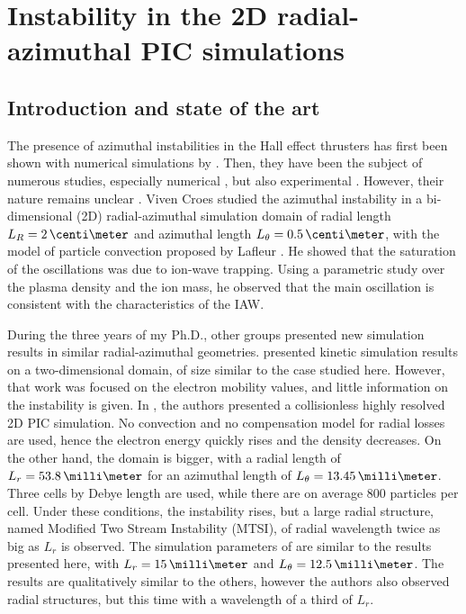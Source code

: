 
\section{Instability in the \acs{2D} radial-azimuthal \acs{PIC} simulations}
  \label{sec-PIC-ECDI}
  
  \subsection{Introduction and state of the art} \label{subsec-indroECDI}
        
    The presence of azimuthal instabilities in the Hall effect thrusters has first been shown with numerical simulations by \citet{adam2004}.
    Then, they have been the subject of numerous studies, especially numerical \citep{ducrocq2006,lafleur2016,lafleur2016a,croes2017,croes2018,janhunen2018,taccogna2019}, but also experimental \citep{honore2011,cavalier2013,cavalier2013a}.
    However, their nature remains unclear \citep{boeuf2018}.
    Viven Croes studied the azimuthal instability in a bi-dimensional (\acs{2D}) radial-azimuthal simulation domain of radial length $L_R=2\,\centi\meter$ and azimuthal length $L_{\theta}=0.5\,\centi\meter$, with the model of particle convection proposed by Lafleur \citep{croes2017,croes2018}.
    He showed that the saturation of the oscillations was due to ion-wave trapping.
    Using a parametric study over the plasma density and the ion mass, he observed that the main oscillation is consistent with the characteristics of the \ac{IAW}.
    
    During the three years of my Ph.D., other groups presented new simulation results in similar radial-azimuthal geometries.
    \citet{hara2019a} presented kinetic simulation results on a two-dimensional domain, of size similar to the case studied here.
    However, that work was focused on the electron mobility values, and little information on the instability is given.
    In \citet{janhunen2018}, the authors presented a collisionless highly resolved \acs{2D} \ac{PIC} simulation.
    No convection and no compensation model for radial losses are used, hence the electron energy quickly rises and the density decreases.
    On the other hand, the domain is bigger, with a radial length of $L_r = 53.8\,\milli\meter$ for an azimuthal length of $L_{\theta} = 13.45 \,\milli\meter$.
    Three cells by Debye length are used, while there are on average 800 particles per cell.
    Under these conditions, the instability rises, but a large radial structure, named Modified Two Stream Instability (MTSI), of radial wavelength twice as big as $L_r$  is observed.
    The simulation parameters of \citet{taccogna2019} are similar to the results presented here, with  $L_r = 15\,\milli\meter$ and $L_{\theta} = 12.5 \,\milli\meter$.
    The results are qualitatively similar to the others, however the authors also observed radial structures, but this time with a wavelength of a third of $L_r$.
        
